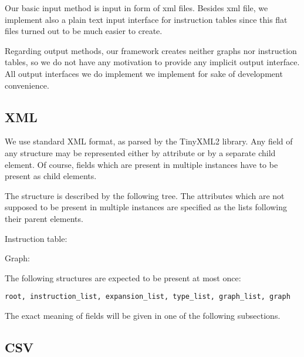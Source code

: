 Our basic input method is input in form of xml files. Besides xml file, we implement also a plain text input interface for instruction tables since this flat files turned out to be much easier to create. 

Regarding output methods, our framework creates neither graphs nor instruction tables, so we do not have any motivation to provide any implicit output interface. All output interfaces we do implement we implement for sake of development convenience.

\subsection{XML}

We use standard XML format, as parsed by the TinyXML2 library. Any field of any structure may be represented either by attribute or by a separate child element. Of course, fields which are present in multiple instances have to be present as child elements.

The structure is described by the following tree. The attributes which are not supposed to be present in multiple instances are specified as the lists following their parent elements.


Instruction table:

Graph:

The following structures are expected to be present at most once: \\ \centerline{\texttt{root, instruction\_list, expansion\_list, type\_list, graph\_list, graph}}

The exact meaning of fields will be given in one of the following subsections.

\subsection{CSV}

